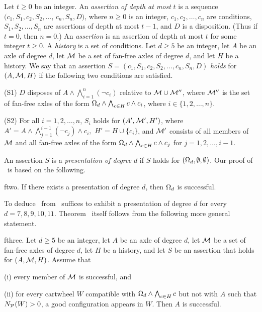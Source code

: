 Let $t\ge 0$ be an integer.  An {\it assertion of depth at most } $t$ 
is a sequence
$(c_1,S_1, c_2, S_2,\dots$, $c_n,S_n,D)$, where $n\ge 0$ is an integer,
$c_1,c_2,\dots, c_n$ are conditions, $S_1, S_2,\dots, S_n$ are assertions 
of depth
at most $t-1$, and $D$ is a disposition. (Thus if $t=0$, then $n=0$.) 
An {\it assertion} is an assertion of
depth at most $t$ for some integer $t\ge 0$.  
A {\it history} is a set of conditions. Let $d\ge5$ be an integer,
let $A$ be an axle of degree $d$, let ${\cal M}$ be a 
set of fan-free axles of degree $d$,
and let $H$ be a history.  We say that an assertion $S=(c_1,S_1,c_2,S_2,\dots, 
c_n,S_n,D)$
{\it holds} for $(A,{\cal M}, H)$ if the following two conditions are
satisfied. 
\item{(S1)} $D$ disposes of $A\wedge\bigwedge^n_{i=1} (\neg
c_i)$ relative  to ${\cal M}\cup
{\cal M}''$, where ${\cal M}''$ is the set of fan-free axles of the form 
$\Omega_d\wedge\bigwedge_{c\in H}
c\wedge c_i$, where $i\in \{1,2,\dots, n\}$.
\item{(S2)} For all $i=1,2,\dots, n$, $S_i$ holds for $(A',
{\cal M}',H')$,  where
$A'=A\wedge\bigwedge_{j=1}^{i-1} (\neg c_j)\wedge c_i,$ $H'=H\cup
\{c_i\}$, and ${\cal M}'$ consists of all members of ${\cal M}$ and all
fan-free axles of  the form
$\Omega_d\wedge\bigwedge_{c\in H}c\wedge c_j$ for $j=1,2,\dots, i-1$.
\smallskip

\noindent An assertion $S$ is a {\it presentation of degree} $d$ if $S$
holds for $(\Omega_d,\emptyset,\emptyset)$.  Our proof of \two\ is based
on the following.

\thm ftwo.  If there exists a presentation of degree $d$, then $\Omega_d$ 
is
successful.  

To deduce \two\ from \ftwo\ suffices to exhibit a presentation of degree 
$d$ for
every $d=7,8,9,10,11$.  Theorem \ftwo\ itself follows from the following 
more general
statement.

\thm fthree.  Let $d\ge 5$ be an integer, let $A$ be an axle of degree 
$d$, let ${\cal M}$
be a set of fan-free axles of degree $d$, let $H$ be a history, and let $S$ be 
an assertion that holds
for $(A,{\cal M}, H)$.  Assume that
\item{(i)} every member of ${\cal M}$ is successful, and
\item{(ii)} for every cartwheel $W$ compatible with $\Omega_d\wedge \bigwedge_{c\in 
H}c$
but not with $A$ such that $N_{\cal P} (W)>0$, a good configuration appears in 
$W$.\ppar
\noindent Then $A$ is successful.

